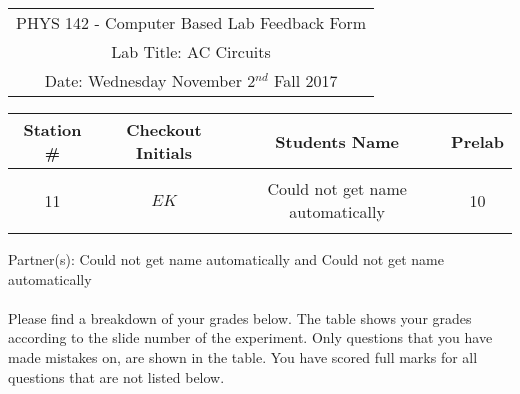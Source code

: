 \documentclass{article}
\begin{document}

\begin{table}[h]
	\centering
	\begin{tabular}{c}
	PHYS 142 - Computer Based Lab Feedback Form\\
	Lab Title: AC Circuits\\Date: Wednesday November 2$^{nd}$ Fall 2017 \\\hline
\end{tabular}
\end{table}
\begin{table}[h]\centering \begin{tabular}{|c|c|p{9.9 cm}|c|}\hline Station \#  & Checkout Initials & \multicolumn{1}{|c|}{Students Name} & Prelab \\\hline\multirow{3}{*}{11}& \multirow{3}{*}{$EK$} & &\\& &\multicolumn{1}{|c|}{Could not get name automatically}&10\\&   &  &\\\hline
\end{tabular}
\end{table}
Partner(s): Could not get name automatically and Could not get name automatically\\
\\Please find a breakdown of your grades below. The table shows your grades according to the slide number of the experiment. Only questions that you have made mistakes on, are shown in the table. You have scored full marks for all questions that are not listed below.
\end{document}
